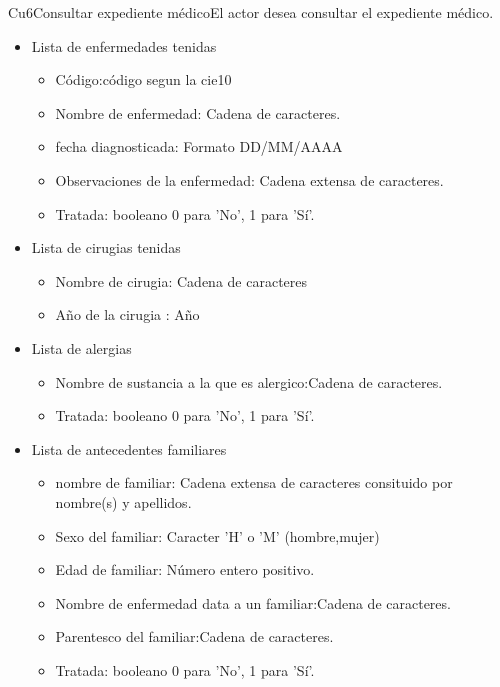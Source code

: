 \begin{UseCase}{Cu6}{Consultar expediente médico}{El actor desea consultar el expediente médico.}
{\begin{itemize}
\begin{itemize}
		\end{itemize}
         
       \item Lista de enfermedades tenidas
        \begin{itemize}
            \item Código:código segun la cie10
            \item Nombre de enfermedad: Cadena de caracteres. 
            \item fecha diagnosticada: Formato DD/MM/AAAA
            \item Observaciones de la enfermedad: Cadena extensa de caracteres.
            \item Tratada: booleano 0 para 'No', 1 para 'Sí'.

        \end{itemize}
        
        \item Lista de cirugias tenidas
        \begin{itemize}
            \item Nombre de cirugia: Cadena de caracteres
            \item Año de la cirugia : Año 
        \end{itemize}
        
        \item Lista de alergias
        \begin{itemize}
            \item Nombre de sustancia a la que es alergico:Cadena de caracteres.
            \item Tratada: booleano 0 para 'No', 1 para 'Sí'.
        \end{itemize}
        
  \item Lista de antecedentes familiares
        
        \begin{itemize}
            \item nombre de familiar: Cadena extensa de caracteres consituido por nombre(s) y apellidos.
            \item Sexo del familiar: Caracter 'H' o 'M' (hombre,mujer)
            \item Edad de familiar: Número entero positivo.
            \item Nombre de enfermedad data a un familiar:Cadena de caracteres.
            \item Parentesco del familiar:Cadena de caracteres.
            \item Tratada: booleano 0 para 'No', 1 para 'Sí'.


\end{itemize}
\end{itemize}}
\end{UseCase}

